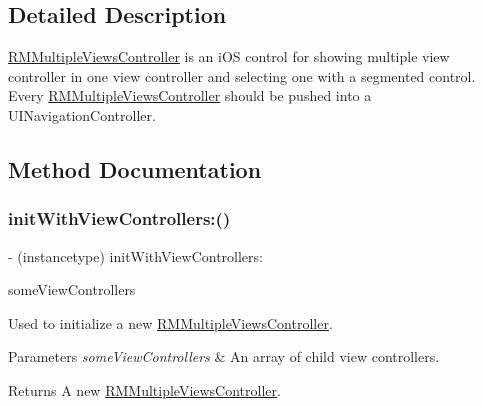 \subsection{Detailed Description}
{\ttfamily \mbox{\hyperlink{interface_r_m_multiple_views_controller}{R\+M\+Multiple\+Views\+Controller}}} is an i\+OS control for showing multiple view controller in one view controller and selecting one with a segmented control. Every {\ttfamily \mbox{\hyperlink{interface_r_m_multiple_views_controller}{R\+M\+Multiple\+Views\+Controller}}} should be pushed into a {\ttfamily U\+I\+Navigation\+Controller}. 

\subsection{Method Documentation}
\mbox{\label{interface_r_m_multiple_views_controller_a57a5d47945554e5375117d96c72a5ca8}} 
\subsubsection{\texorpdfstring{init\+With\+View\+Controllers\+:()}{initWithViewControllers:()}}
{\footnotesize\ttfamily -\/ (instancetype) init\+With\+View\+Controllers\+: \begin{DoxyParamCaption}\item[{(N\+S\+Array $\ast$)}]{some\+View\+Controllers }\end{DoxyParamCaption}}

Used to initialize a new {\ttfamily \mbox{\hyperlink{interface_r_m_multiple_views_controller}{R\+M\+Multiple\+Views\+Controller}}}.


\begin{DoxyParams}{Parameters}
{\em some\+View\+Controllers} & An array of child view controllers.\\
\hline
\end{DoxyParams}
\begin{DoxyReturn}{Returns}
A new {\ttfamily \mbox{\hyperlink{interface_r_m_multiple_views_controller}{R\+M\+Multiple\+Views\+Controller}}}. 
\end{DoxyReturn}
\mbox{\label{interface_r_m_multiple_views_controller_a29d7315c4bd1c8bf1c7cc249bc5a4ae6}} 
